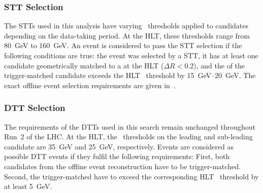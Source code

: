 %




\subsubsection{STT Selection}

The STTs used in this analysis have varying \pT~thresholds applied to \tauhadvis
candidates depending on the data-taking period. At the HLT, these thresholds
range from \SI{80}{\GeV} to \SI{160}{\GeV}. An event is considered to pass the
STT selection if the following conditions are true: the event was selected by a
STT, it has at least one \tauhadvis candidate geometrically matched to a
\tauhadvis at the HLT ($\Delta R < 0.2$), and the \pT of the trigger-matched
\tauhadvis candidate exceeds the HLT \pT~threshold by \SIrange{15}{20}{\GeV}.
The exact offline event selection requirements are given
in~.

\subsubsection{DTT Selection}

The \tauhadvis \pT requirements of the DTTs used in this search remain unchanged
throughout Run~2 of the LHC. At the HLT, the \pT~thresholds on the leading and
sub-leading \tauhadvis candidate are \SI{35}{\GeV} and \SI{25}{\GeV},
respectively. Events are considered as possible DTT events if they fulfil the
following requirements: First, both \tauhadvis candidates from the offline event
reconstruction have to be trigger-matched. Second, the trigger-matched
\tauhadvis have to exceed the corresponding HLT \pT~threshold by at least
\SI{5}{\GeV}.

